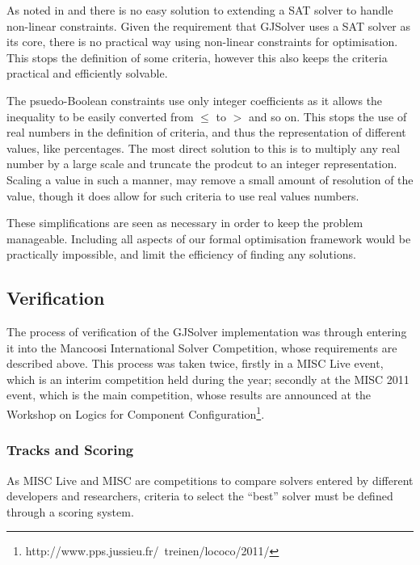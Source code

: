 As noted in \cite{le_berre_dependency_2009} and \cite{leBerre2010} there is no easy solution to extending a SAT solver to handle non-linear constraints.
Given the requirement that GJSolver uses a SAT solver as its core, there is no practical way using non-linear constraints for optimisation.
This stops the definition of some criteria, however this also keeps the criteria practical and efficiently solvable.   

The psuedo-Boolean constraints use only integer coefficients as it allows the inequality to be easily converted from $\leq$ to $>$ and so on.
This stops the use of real numbers in the definition of criteria, and thus the representation of different values, like percentages.
The most direct solution to this is to multiply any real number by a large scale and truncate the prodcut to an integer representation.
Scaling a value in such a manner, may remove a small amount of resolution of the value, though it does allow for such criteria to use real values numbers.

These simplifications are seen as necessary in order to keep the problem manageable.
Including all aspects of our formal optimisation framework would be practically impossible, and limit the efficiency of finding any solutions.

\subsection{Verification}
The process of verification of the GJSolver implementation was through entering it into the Mancoosi International Solver Competition, whose requirements are described above.
This process was taken twice, firstly in a MISC Live event, which is an interim competition held during the year;
secondly at the MISC 2011 event, 
which is the main competition, whose results are announced at the Workshop on Logics for Component Configuration\footnote{http://www.pps.jussieu.fr/~treinen/lococo/2011/}.

\subsubsection{Tracks and Scoring}
As MISC Live and MISC are competitions to compare solvers entered by different developers and researchers,
criteria to select the ``best'' solver must be defined through a scoring system.

